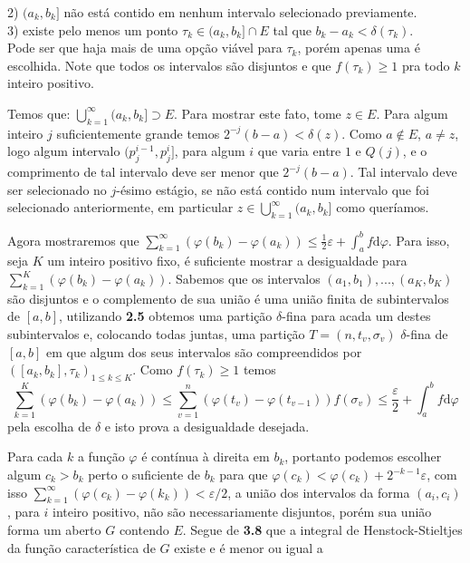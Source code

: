 \documentclass[12pt, a4paper]{article}
\theoremstyle{definition}
\begin{document}
2) $(a_k,b_k]$ não está contido em nenhum intervalo selecionado previamente. \\

3) existe pelo menos um ponto $\tau_k \in (a_k,b_k]\cap E$ tal que $b_k-a_k<\delta(\tau_k)$. \\

Pode ser que haja mais de uma opção viável para $\tau_k$, porém apenas uma é escolhida. Note que todos os intervalos são disjuntos e que $f(\tau_k)\geq 1$ pra todo $k$ inteiro positivo.  

Temos que: $\bigcup_{k=1}^{\infty} (a_k,b_k]\supset E$. Para mostrar este fato, tome $z\in E$. Para algum inteiro $j$ suficientemente grande temos $2^{-j}(b-a)<\delta(z)$. Como $a\notin E$, $a\neq z$, logo algum intervalo $(p_j^{i-1},p_j^i]$, para algum $i$ que varia entre $1$ e $Q(j)$, e o comprimento de tal intervalo deve ser menor que $2^{-j}(b-a)$. Tal intervalo deve ser selecionado no $j$-ésimo estágio, se não está contido num intervalo que foi selecionado anteriormente, em particular $z\in \bigcup_{k=1}^{\infty} (a_k,b_k]$ como queríamos.  

Agora mostraremos que $\sum_{k=1}^\infty (\varphi(b_k)-\varphi(a_k))\leq \frac{1}{2}\varepsilon +\int_a^b f \text{d}\varphi$. Para isso, seja $K$ um inteiro positivo fixo, é suficiente mostrar a desigualdade para $\sum_{k=1}^K (\varphi(b_k)-\varphi(a_k))$. Sabemos que os intervalos $(a_1,b_1),...,(a_K,b_K)$ são disjuntos e o complemento de sua união é uma união finita de subintervalos de $[a,b]$, utilizando \textbf{2.5} obtemos uma partição $\delta$-fina para acada um destes subintervalos e, colocando todas juntas, uma partição $T=(n,t_v,\sigma_v)$ $\delta$-fina de $[a,b]$ em que algum dos seus intervalos são compreendidos por $([a_k,b_k],\tau_k)_{1\leq k \leq K}$. Como $f(\tau_k)\geq 1$ temos $$\sum_{k=1}^{K}(\varphi(b_k)-\varphi(a_k)) \leq \sum_{v=1}^{n}(\varphi(t_v)-\varphi(t_{v-1}))f(\sigma_v)\leq   \frac{\varepsilon}{2} +\int_a^b f \text{d}\varphi$$ pela escolha de $\delta$ e isto prova a desigualdade desejada.

Para cada $k$ a função $\varphi$ é contínua à direita em $b_k$, portanto podemos escolher algum $c_k>b_k$ perto o suficiente de $b_k$ para que $\varphi(c_k) < \varphi(c_k) + 2^{-k-1}\varepsilon$, com isso $\sum_{k=1}^\infty (\varphi(c_k)-\varphi(k_k))<\varepsilon / 2$, a união dos intervalos da forma $(a_i,c_i)$, para $i$ inteiro positivo, não são necessariamente disjuntos, porém sua união forma um aberto $G$ contendo $E$. Segue de \textbf{3.8} que a integral de Henstock-Stieltjes da função característica de $G$ existe e é menor ou igual a 
\end{document}
